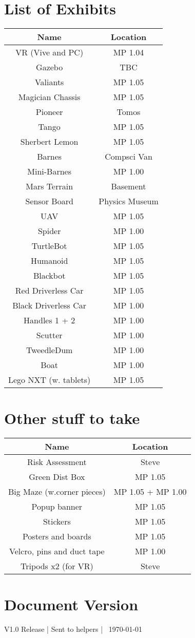 \documentclass[a4paper]{article}
\begin{document}
\section*{List of Exhibits}
\begin{center}
\begin{tabular}{ |c|c| } 
\hline
Name & Location \\
\hline
\hline
VR (Vive and PC) & MP 1.04 \\ 
\hline
Gazebo & TBC \\
\hline
Valiants & MP 1.05 \\
\hline
Magician Chassis & MP 1.05 \\
\hline
Pioneer & Tomos \\
\hline
Tango & MP 1.05 \\
\hline
Sherbert Lemon & MP 1.05 \\
\hline
Barnes & Compsci Van \\
\hline
Mini-Barnes & MP 1.00 \\
\hline
Mars Terrain & Basement \\
\hline
Sensor Board & Physics Museum \\
\hline
UAV & MP 1.05 \\
\hline
Spider & MP 1.00 \\
\hline
TurtleBot & MP 1.05 \\
\hline
Humanoid & MP 1.05 \\
\hline
Blackbot & MP 1.05 \\
\hline
Red Driverless Car & MP 1.05 \\
\hline
Black Driverless Car & MP 1.00 \\
\hline
Handles 1 + 2 & MP 1.00 \\
\hline
Scutter & MP 1.00 \\
\hline 
TweedleDum & MP 1.00 \\
\hline
Boat & MP 1.00 \\
\hline
Lego NXT (w. tablets) & MP 1.05 \\
\hline
\end{tabular}
\end{center}

\section*{Other stuff to take}
\begin{center}
\begin{tabular}{ |c|c| } 
\hline
Name & Location \\
\hline
\hline
Risk Assessment & Steve \\ 
\hline
Green Dist Box & MP 1.05 \\ 
\hline
Big Maze (w.corner pieces) & MP 1.05 + MP 1.00 \\ 
\hline
Popup banner & MP 1.05 \\
\hline
Stickers & MP 1.05 \\
\hline
Posters and boards & MP 1.05 \\
\hline
Velcro, pins and duct tape & MP 1.00 \\
\hline
Tripods x2 (for VR) & Steve \\
\hline 
\end{tabular}
\end{center}

\section*{Document Version}
V1.0 Release | Sent to helpers | \currenttime \ \today
\end{document}
